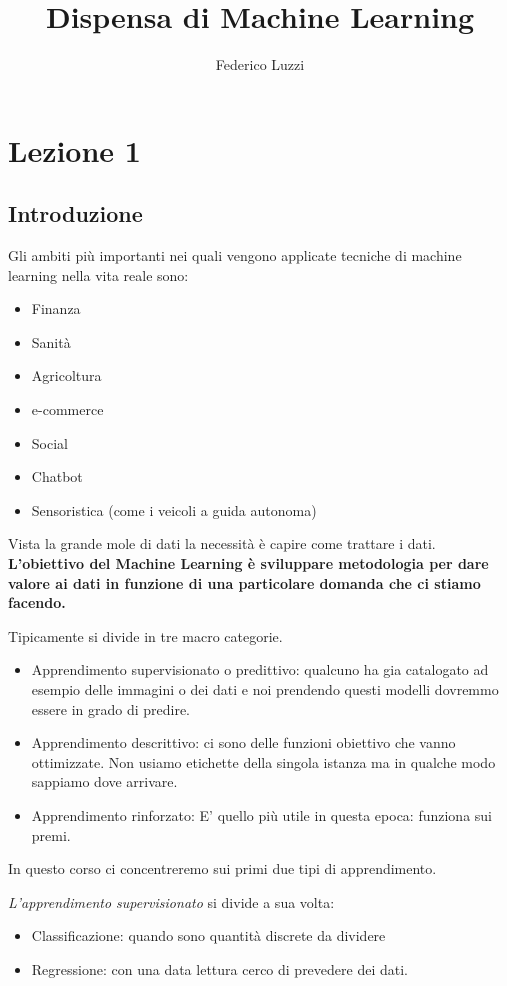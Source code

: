 \documentclass[12pt, a4paper,titlepage,openany]{article}
\title{Dispensa di Machine Learning}
\author{Federico Luzzi}
\date{}
\begin{document}
	\maketitle
	
\tableofcontents
\section{Lezione 1}

\subsection{Introduzione}
Gli ambiti più importanti nei quali vengono applicate tecniche di machine learning nella vita reale sono:
\begin{itemize}
	\item Finanza
	\item Sanità
	\item Agricoltura
	\item e-commerce
	\item Social
	\item Chatbot
	\item Sensoristica (come i veicoli a guida autonoma)
\end{itemize}

Vista la grande mole di dati la necessità è capire come trattare i dati.
\textbf{L'obiettivo del Machine Learning è sviluppare metodologia per dare valore ai dati in funzione di una particolare domanda che ci stiamo facendo.}

Tipicamente si divide in tre macro categorie.
\begin{itemize}
	\item Apprendimento supervisionato o predittivo: qualcuno ha gia catalogato ad esempio delle immagini o dei dati e noi prendendo questi modelli dovremmo essere in grado di predire.
	\item Apprendimento descrittivo: ci sono delle funzioni obiettivo che vanno ottimizzate. Non usiamo etichette della singola istanza ma in qualche modo sappiamo dove arrivare.
	\item Apprendimento rinforzato: E' quello più utile in questa epoca: funziona sui premi.
\end{itemize}

In questo corso ci concentreremo sui primi due tipi di apprendimento.

\textit{L'apprendimento supervisionato} si divide a sua volta:
\begin{itemize}
	\item Classificazione: quando sono quantità discrete da dividere
	\item Regressione: con una data lettura cerco di prevedere dei dati.
\end{itemize}
\end{document}
